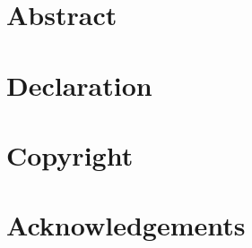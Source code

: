 \maketitle

\clearpage

\section*{Abstract}

\section*{Declaration}

\section*{Copyright}

\section*{Acknowledgements}

\clearpage

\tableofcontents

\clearpage

\printacronyms[name=Acronyms and Abbreviations]

\listoffigures

\listoftables

\listoflistings

